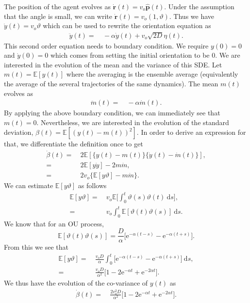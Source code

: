 \documentclass[%
reprint,
superscriptaddress,
floatfix,
amsmath,
amssymb,
aps,
notitlepage
]{revtex4-1}
\def\d{\text{d}}
\def\e{\text{e}}
\def\r{\mathbf{r}}
\def\E{\mathbb{E}}
\def\ph{\hat{\mathbf{p}}}
\def\yd{\dot{y}}
\def\theta{\vartheta}
\begin{document}
The position of the agent evolves as $\dot{\r}(t) = v_o \ph(t)$. Under the assumption that the angle
is small, we can write $\dot{\r}(t) = v_o (1, \theta)$. Thus we have $\yd (t) = v_o \theta$ which can
be used to rewrite the orientation equation as
\begin{align}
    \ddot{y}(t) =& \ - \alpha \yd (t) + v_o\sqrt{2 D} \eta(t).
\end{align}
This second order equation needs to boundary condition. We require $y(0) = 0$ and $\yd (0) = 0$ which
comes from setting the initial orientation to be 0. We are interested in the evolution of the mean and
the variance of this SDE. Let $m(t)= \E [  y(t) ]$ where the averaging is the ensemble average
(equivalently the average of the several trajectories of the same dynamics). The mean $m(t)$ evolves as
\begin{align}
    \ddot{m}(t) =& \ -\alpha \dot{m}(t).
\end{align}
By applying the above boundary condition, we can immediately see that $m(t) = 0$. Nevertheless, we are
interested in the evolution of the standard deviation, $\beta(t) = \E [  {(y(t) - m(t))}^2 ]$.
In order to derive an expression for that, we differentiate the definition once to get
\begin{align*}
    \dot{\beta}(t) =& \ 2 \E [ \{ y(t) - m(t) \} \{ \yd(t) - \dot{m}(t) \} ], \\
    = & \ 2 \E [ y \yd ] - 2 m \dot{m}, \\
    = & \ 2 v_o \{ \E [ y \theta ] - m \dot{m}\}.
\end{align*}
We can estimate $\E [ y \theta ]$ as follows
\begin{align*}
    \E [ y \theta ] =& \ v_o \E \bigg[ \int_0^t \theta(s) \theta(t) \ \d s \bigg], \\
    =& \ v_o  \int_0^t \E [ \theta(t) \theta(s) ] \ \d s.
\end{align*}
We know that for an OU process, 
\[
    \E [ \theta(t) \theta(s) ] = \frac{D}{\alpha} \bigg[ \e^{-\alpha(t-s)}-\e^{-\alpha(t+s)} \bigg].
\]
From this we see that
\begin{align*}
    \E [ y \theta ] =& \ \frac{v_o D}{\alpha} \int_0^t  \bigg[ \e^{-\alpha(t-s)}-\e^{-\alpha(t+s)} \bigg] \ \d s, \\
    =& \ \frac{v_o D}{\alpha^2} \bigg[ 1 - 2 \e^{-\alpha t} + \e^{-2 \alpha t}\bigg].
\end{align*}
We thus have the evolution of the co-variance of $y(t)$ as
\begin{align}
    \dot{\beta}(t) = & \  \frac{2 v_o^2 D}{\alpha^2} \bigg[ 1 - 2 \e^{-\alpha t} + \e^{-2 \alpha t}\bigg].
\end{align}
\end{document}
